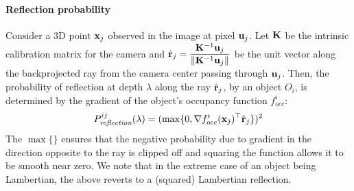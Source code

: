 \paragraph{Reflection probability}
Consider a 3D point $\mathbf{x}_j$ observed in the image at pixel $\mathbf{u}_j$. Let $\mathbf{K}$ be the intrinsic calibration matrix for the camera and $\hat{\mathbf{r}}_j = \displaystyle\frac{\mathbf{K}^{-1}\mathbf{u}_j}{\lVert \mathbf{K}^{-1}\mathbf{u}_j \rVert}$ be the unit vector along the backprojected ray from the camera center passing through $\mathbf{u}_j$. Then, the probability of reflection at depth $\lambda$ along the ray $\hat{\mathbf{r}}_j$, by an object $O_i$, is determined by the gradient of the object's occupancy function $f_{occ}^i$:
\begin{align}
  P^{ij}_{\textit{reflection}} (\lambda) = (\max \{0, \nabla {f^i_{occ}}(\mathbf{x}_j)^\top \hat{\mathbf{r}}_j \})^2
\label{eq:evalPrefl}
\end{align}
The $\max \{ \}$ ensures that the negative probability due to gradient in the direction opposite to the ray is clipped off and squaring the function allows it to be smooth near zero. We note that in the extreme case of an object being Lambertian, the above reverts to a (squared) Lambertian reflection.


